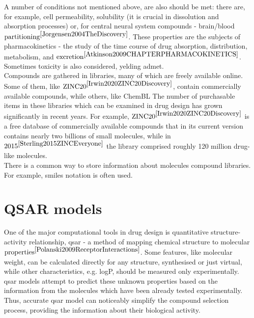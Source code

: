 A number of conditions not mentioned above, are also should be met: there are, for example, cell permeability, solubility (it is crucial in dissolution and absorption processes) or, for central neural system compounds - brain/blood $\text{partitioning}^{\cite{Jorgensen2004TheDiscovery}}$.
These properties are the subjects of pharmacokinetics - the study of the
time course of drug absorption, distribution, metabolism, and $\text{excretion}^{\cite{Atkinson2009CHAPTERPHARMACOKINETICS}}$. Sometimes toxicity is also considered, yelding \acrshort{admet}. \\

Compounds are gathered in libraries, many of which are freely available online.
Some of them, like $\text{ZINC20}^{\cite{Irwin2020ZINC20Discovery}}$, contain commercially available compounds, while others, like ChemBL
The number of purchasable items in these libraries which can be examined in drug design has grown significantly in recent years.
For example, $\text{ZINC20}^{\cite{Irwin2020ZINC20Discovery}}$ is a free database of commercially available compounds that in its current version contains nearly two billions of small molecules, while in $\text{2015}^{\cite{Sterling2015ZINCEveryone}}$ the library comprised roughly 120 million drug-like molecules.\\

There is a common way to store information about molecules compound libraries.
For example, \acrshort{smiles} notation is often used.\\

\section{QSAR models}
One of the major computational tools in drug design is quantitative structure-activity relationship, \acrshort{qsar} - a method of mapping chemical structure to molecular $\text{properties}^{\cite{Polanski2009ReceptorInteractions}}$. 
Some features, like molecular weight, can be calculated directly for any structure, synthesised or just virtual, while other characteristics, e.g. logP, should be measured only experimentally.
\acrshort{qsar} models attempt to predict these unknown properties based on the information from the molecules which have been already tested experimentally.
Thus, accurate \acrshort{qsar} model can noticeably simplify the compound selection process, providing the information about their biological activity.\\

